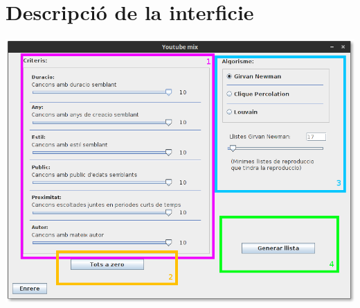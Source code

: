 \documentclass[letterpaper,10pt,oneside]{sphinxmanual}
\begin{document}
\section{Descripció de la interficie}
\label{gen_llistes:descripcio-de-la-interficie}
\includegraphics{gen_llist.png}
\end{document}
